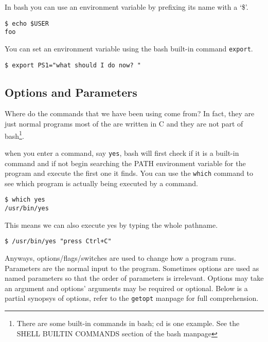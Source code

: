 \documentclass[10pt]{article}
\begin{document}
  In bash you can use an environment variable by prefixing its name with a `\$'.

\begin{verbatim}
$ echo $USER
foo
\end{verbatim}

  You can set an environment variable using the bash built-in command \texttt{export}. 

\begin{verbatim}
$ export PS1="what should I do now? "
\end{verbatim}  
  

  \subsection{Options and Parameters} 
  Where do the commands that we have been using come from? In fact, they are just normal programs
  most of the are written in C and they are not part of bash\footnote{There are some built-in commands in bash; cd is one example. See the SHELL BUILTIN COMMANDS section of the bash manpage }.

  when you enter a command, say \texttt{yes}, bash will first check if it is a built-in command
  and if not begin searching the PATH environment variable for the program and execute the first one it finds. You can use the \texttt{which} command to see which program is actually being executed by a command.

\begin{verbatim}
$ which yes
/usr/bin/yes
\end{verbatim}    

  This means we can also execute yes by typing the whole pathname.
  
\begin{verbatim}
$ /usr/bin/yes "press Ctrl+C"
\end{verbatim}

  Anyways, options/flags/switches are used to change how a program runs. Parameters are the normal input to the program. Sometimes options are used as named parameters so that the order of parameters is irrelevant. Options may take an argument and options' arguments may be required or optional. Below is a partial synopsys of options, refer to the \texttt{getopt} manpage for full comprehension.
\end{document}
